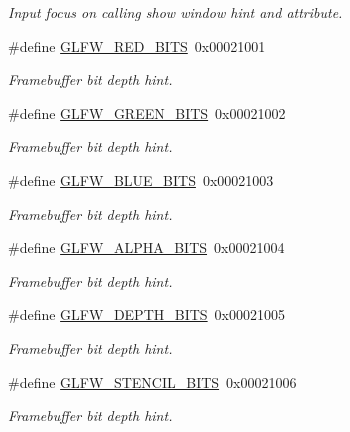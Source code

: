 \begin{DoxyCompactItemize}
\begin{DoxyCompactList}\small\item\em Input focus on calling show window hint and attribute. \end{DoxyCompactList}\item 
\#define \mbox{\hyperlink{group__window_gaf78ed8e417dbcc1e354906cc2708c982}{G\+L\+F\+W\+\_\+\+R\+E\+D\+\_\+\+B\+I\+TS}}~0x00021001
\begin{DoxyCompactList}\small\item\em Framebuffer bit depth hint. \end{DoxyCompactList}\item 
\#define \mbox{\hyperlink{group__window_gafba3b72638c914e5fb8a237dd4c50d4d}{G\+L\+F\+W\+\_\+\+G\+R\+E\+E\+N\+\_\+\+B\+I\+TS}}~0x00021002
\begin{DoxyCompactList}\small\item\em Framebuffer bit depth hint. \end{DoxyCompactList}\item 
\#define \mbox{\hyperlink{group__window_gab292ea403db6d514537b515311bf9ae3}{G\+L\+F\+W\+\_\+\+B\+L\+U\+E\+\_\+\+B\+I\+TS}}~0x00021003
\begin{DoxyCompactList}\small\item\em Framebuffer bit depth hint. \end{DoxyCompactList}\item 
\#define \mbox{\hyperlink{group__window_gafed79a3f468997877da86c449bd43e8c}{G\+L\+F\+W\+\_\+\+A\+L\+P\+H\+A\+\_\+\+B\+I\+TS}}~0x00021004
\begin{DoxyCompactList}\small\item\em Framebuffer bit depth hint. \end{DoxyCompactList}\item 
\#define \mbox{\hyperlink{group__window_ga318a55eac1fee57dfe593b6d38149d07}{G\+L\+F\+W\+\_\+\+D\+E\+P\+T\+H\+\_\+\+B\+I\+TS}}~0x00021005
\begin{DoxyCompactList}\small\item\em Framebuffer bit depth hint. \end{DoxyCompactList}\item 
\#define \mbox{\hyperlink{group__window_ga5339890a45a1fb38e93cb9fcc5fd069d}{G\+L\+F\+W\+\_\+\+S\+T\+E\+N\+C\+I\+L\+\_\+\+B\+I\+TS}}~0x00021006
\begin{DoxyCompactList}\small\item\em Framebuffer bit depth hint. \end{DoxyCompactList}\item 

\end{DoxyCompactItemize}
